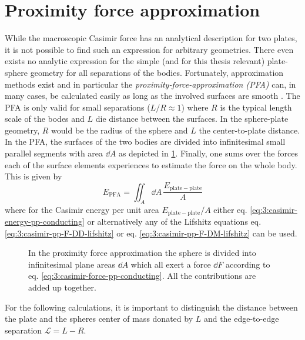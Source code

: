 \section{Proximity force approximation}\label{sec:3:pfa}

While the macroscopic Casimir force has an analytical description for two plates, it is not possible to find such an expression for arbitrary geometries. There even exists no analytic expression for the
simple (and for this thesis relevant) plate-sphere geometry for all separations of the bodies.
Fortunately, approximation methods exist and in particular the \emph{proximity-force-approximation (PFA)} can, in many cases, be calculated easily as long as the involved surfaces are smooth \cite{Hartmann_2018,Emig_2007a,Bulgac_2006}.
The PFA is only valid for small separations ($L/R \approx 1$) where $R$ is the typical length scale of the bodes and $L$ die distance between the surfaces.
In the sphere-plate geometry, $R$ would be the radius of the sphere and $L$ the center-to-plate distance.
In the PFA, the surfaces of the two bodies are divided into infinitesimal small parallel segments with area $\dd A$ as depicted in \cref{fig:3:PFA}.
Finally, one sums over the forces each of the surface elements experiences to estimate the force on the whole body. This is given by
\begin{equation}\label{eq:3:pfa}
  E_\mathrm{PFA} = \iint_A \dd A \, \frac{E_\mathrm{plate-plate}}{A}
\end{equation}
where for the Casimir energy per unit area $E_\mathrm{plate-plate}/A$ either eq. \eqref{eq:3:casimir-energy-pp-conducting} or alternatively any of the Lifshitz equations eq. \eqref{eq:3:casimir-pp-F-DD-lifshitz} or eq. \eqref{eq:3:casimir-pp-F-DM-lifshitz} can be used.
\begin{figure}[!htbp]
  \centering
  \def\svgwidth{0.55\textwidth}
  
  \caption{In the proximity force approximation the sphere is divided into infinitesimal plane areas $\dd A$ which all exert a force $\dd F$ according to eq. \eqref{eq:3:casimir-force-pp-conducting}. All the contributions are added up together.}
  \label{fig:3:PFA}
\end{figure}
For the following calculations, it is important to distinguish the distance between the plate and the spheres center of mass donated by $L$ and the edge-to-edge separation $\mathscr{L} = L - R$.

